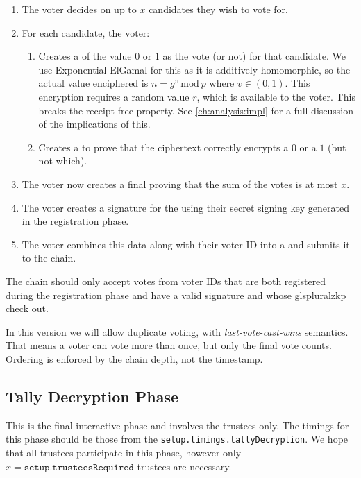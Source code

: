 \begin{enumerate}
    \item The voter decides on up to $x$ candidates they wish to vote for.
    \item For each candidate, the voter:
          \begin{enumerate}
              \item Creates a  of the value $0$ or $1$ as the vote (or not) for that candidate. We use Exponential ElGamal for this as it is additively homomorphic, so the actual value enciphered is $n = g^v\ \textrm{mod}\ p$ where $v \in (0,1)$. This encryption requires a random value $r$, which is available to the voter. This breaks the receipt-free property. See \autoref{ch:analysis:impl} for a full discussion of the implications of this.
              \item Creates a  to prove that the ciphertext correctly encrypts a $0$ or a $1$ (but not which). 
          \end{enumerate}
    \item The voter now creates a final  proving that the sum of the votes is at most $x$.
    \item The voter creates a signature for the  using their secret signing key generated in the registration phase.
    \item The voter combines this data along with their voter ID into a  and submits it to the chain.
\end{enumerate}

The chain should only accept votes from voter IDs that are both registered during the registration phase and have a valid signature and whose glsplural{zkp} check out.

In this version we will allow duplicate voting, with \emph{last-vote-cast-wins} semantics. That means a voter can vote more than once, but only the final vote counts. Ordering is enforced by the chain depth, not the timestamp.

\subsection{Tally Decryption Phase}
\label{ch:astris:detail:tally}

This is the final interactive phase and involves the trustees only. The timings for this phase should be those from the \texttt{setup.timings.tallyDecryption}. We hope that all trustees participate in this phase, however only $x = \texttt{setup.trusteesRequired}$ trustees are necessary.

